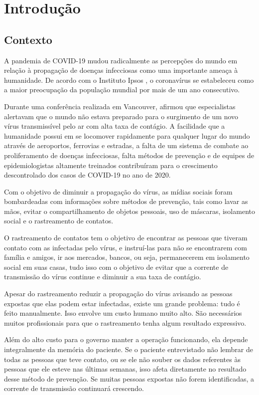 \chapter{Introdução}\label{chp:Introducao}

\section{Contexto}\label{sec:contexto}
A pandemia de COVID-19 mudou radicalmente as percepções do mundo em relação à propagação de doenças infecciosas como uma importante ameaça à humanidade. De acordo com o Instituto Ipsos \cite{Gebrekal2021}, o coronavírus se estabeleceu como a maior preocupação da população mundial por mais de um ano consecutivo.

Durante uma conferência realizada em Vancouver, \textcite{Gates2015} afirmou que especialistas alertavam que o mundo não estava preparado para o surgimento de um novo vírus transmissível pelo ar com alta taxa de contágio. A facilidade que a humanidade possui em se locomover rapidamente para qualquer lugar do mundo através de aeroportos, ferrovias e estradas, a falta de um sistema de combate ao proliferamento de doenças infecciosas, falta métodos de prevenção e de equipes de epidemiologistas altamente treinados contribuíram para o crescimento descontrolado dos casos de COVID-19 no ano de 2020.

Com o objetivo de diminuir a propagação do vírus, as mídias sociais foram bombardeadas com informações sobre métodos de prevenção, tais como lavar as mãos, evitar o compartilhamento de objetos pessoais, uso de máscaras, isolamento social e o rastreamento de contatos.

O rastreamento de contatos tem o objetivo de encontrar as pessoas que tiveram contato com as infectadas pelo vírus, e instruí-las para não se encontrarem com família e amigos, ir aos mercados, bancos, ou seja, permanecerem em isolamento social em suas casas, tudo isso com o objetivo de evitar que a corrente de transmissão do vírus continue e diminuir a sua taxa de contágio.

Apesar do rastreamento reduzir a propagação do vírus avisando as pessoas expostas que elas podem estar infectadas, existe um grande problema: tudo é feito manualmente. Isso envolve um custo humano muito alto. São necessários muitos profissionais para que o rastreamento tenha algum resultado expressivo.

Além do alto custo para o governo manter a operação funcionando, ela depende integralmente da memória do paciente. Se o paciente entrevistado não lembrar de todas as pessoas que teve contato, ou se ele não souber os dados referentes às pessoas que ele esteve nas últimas semanas, isso afeta diretamente no resultado desse método de prevenção. Se muitas pessoas expostas não forem identificadas, a corrente de transmissão continuará crescendo.

